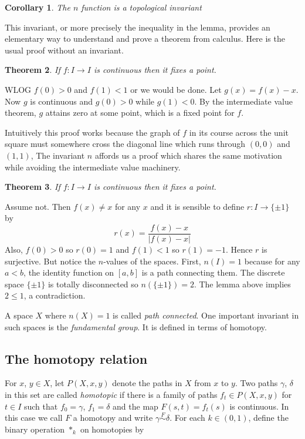 \documentclass[letterpaper]{article}
\newtheorem{theorem}{Theorem}[section]
\newtheorem{corollary}[theorem]{Corollary}
\newenvironment{proof}[1][Proof]{\begin{trivlist}
\item[\hskip \labelsep {\bfseries #1}]}{\end{trivlist}}
\begin{document}
\begin{corollary}
The $n$ function is a topological invariant
\end{corollary}

This invariant, or more precisely the inequality in the lemma, provides an elementary way to understand and prove a theorem from calculus. Here is the usual proof without an invariant.

\begin{theorem}
If $f \colon I \rightarrow I$ is continuous then it fixes a point.
\end{theorem}
\begin{proof}
WLOG $f(0) > 0$ and $f(1) < 1$ or we would be done. Let $g(x) = f(x) - x$. Now $g$ is continuous and $g(0) > 0$ while $g(1) < 0$. By the intermediate value theorem, $g$ attains zero at some point, which is a fixed point for $f$.
\end{proof}

Intuitively this proof works because the graph of $f$ in its course across the unit square must somewhere cross the diagonal line which runs through $(0, 0)$ and $(1, 1)$, The invariant $n$ affords us a proof which shares the same motivation while avoiding the intermediate value machinery.

\begin{theorem}
If $f \colon I \rightarrow I$ is continuous then it fixes a point.
\end{theorem}
\begin{proof}
Assume not. Then $f(x) \neq x$ for any $x$ and it is sensible to define $r \colon I \rightarrow \{\pm 1\}$ by \[ r(x) = \frac{f(x) - x}{|f(x) - x|} \] Also, $f(0) > 0$ so $r(0) = 1$ and $f(1) < 1$ so $r(1) = -1$. Hence $r$ is surjective. But notice the $n$-values of the spaces. First, $n(I) = 1$ because for any $a < b$, the identity function on $[a, b]$ is a path connecting them. The discrete space $\{\pm 1\}$ is totally disconnected so $n(\{\pm 1\}) = 2$. The lemma above implies $2 \leq 1$, a contradiction.
\end{proof}

A space $X$ where $n(X) = 1$ is called \emph{path connected}. One important invariant in such spaces is the \emph{fundamental group}. It is defined in terms of homotopy.

\subsection{The homotopy relation}

For $x$, $y \in X$, let $P(X, x, y)$ denote the paths in $X$ from $x$ to $y$. Two paths $\gamma$, $\delta$ in this set are called \emph{homotopic} if there is a family of paths $f_t \in P(X, x, y)$ for $t \in I$ such that $f_0 = \gamma$, $f_1 = \delta$ and the map $F(s, t) = f_t(s)$ is continuous. In this case we call $F$ a homotopy and write $\gamma \overset{F}{\sim} \delta$. For each $k \in (0, 1)$, define the binary operation $\ast_k$ on homotopies by
\end{document}
